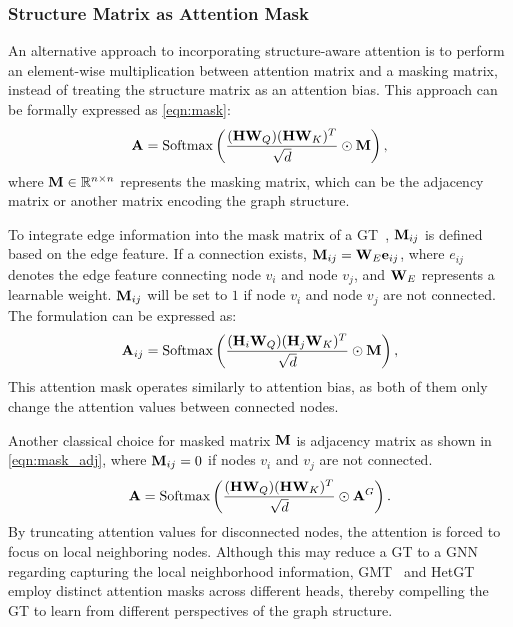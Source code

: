 \subsubsection{Structure Matrix as Attention Mask}\label{sec:attention-mask}
An alternative approach to incorporating structure-aware attention is to perform an element-wise multiplication between attention matrix and a masking matrix, instead of treating the structure matrix as an attention bias. %
This approach can be formally expressed as \cref{eqn:mask}:
\begin{align}
\label{eqn:mask}
    \mathbf{A}=\text{Softmax}\left(\frac{(\mathbf{H}\mathbf{W}_{Q})(\mathbf{H}\mathbf{W}_{K})^T}{\sqrt{d}} \odot \mathbf{M}\right),
\end{align}
where $\mathbf{M} \in \mathbb{R}^{n\times n}$ represents the masking matrix, which can be the adjacency matrix or another matrix encoding the graph structure. 

To integrate edge information into the mask matrix of a GT~\cite{dwivedi2021generalization}, $\mathbf{M}_{ij}$ is defined based on the edge feature. If a connection exists, $\mathbf{M}_{ij}=\mathbf{W}_{E} \mathbf{e}_{ij}$, where $e_{ij}$ denotes the edge feature connecting node $v_i$ and node $v_j$, and $\mathbf{W}_{E}$ represents a learnable weight. $\mathbf{M}_{ij}$ will be set to $1$ if node $v_i$ and node $v_j$ are not connected. The formulation can be expressed as:
\begin{align}
\label{eqn:mask_edge}
    \mathbf{A}_{ij}=\text{Softmax}\left(\frac{(\mathbf{H}_i\mathbf{W}_{Q})(\mathbf{H}_j\mathbf{W}_{K})^T}{\sqrt{d}} \odot \mathbf{M}\right),
\end{align}
This attention mask operates similarly to attention bias, as both of them only change the attention values between connected nodes.



Another classical choice for masked matrix $\mathbf{M}$ is adjacency matrix as shown in \cref{eqn:mask_adj}, where $\mathbf{M}_{ij}=0$ if nodes $v_i$ and $v_j$ are not connected.
\begin{align}
\label{eqn:mask_adj}
    \mathbf{A}=\text{Softmax}\left(\frac{(\mathbf{H}\mathbf{W}_{Q})(\mathbf{H}\mathbf{W}_{K})^T}{\sqrt{d}} \odot \mathbf{A}^{G}\right).
\end{align}
By truncating attention values for disconnected nodes,  the attention is forced to focus on local neighboring nodes. Although this may reduce a GT to a GNN regarding capturing the local neighborhood information, GMT~\cite{min2022masked} and HetGT~\cite{yao2020heterogeneous} employ distinct attention masks across different heads, thereby compelling the GT to learn from different perspectives of the graph structure. 

